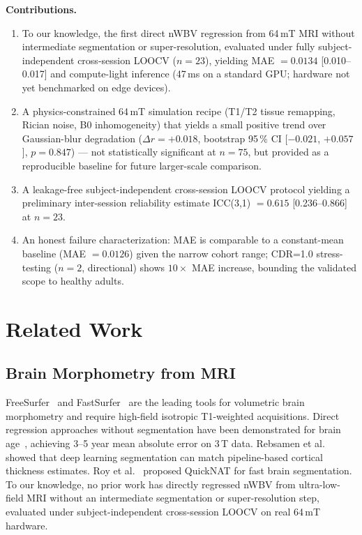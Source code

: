 \documentclass[12pt,a4paper]{article}
\begin{document}
\textbf{Contributions.}
\begin{enumerate}
  \item To our knowledge, the first direct nWBV regression from 64\,mT MRI
        without intermediate segmentation or super-resolution, evaluated under
        fully subject-independent cross-session LOOCV ($n = 23$), yielding
        MAE $= 0.0134$ [0.010--0.017] and compute-light inference (47\,ms
        on a standard GPU; hardware not yet benchmarked on edge devices).
  \item A physics-constrained 64\,mT simulation recipe (T1/T2 tissue
        remapping, Rician noise, B0 inhomogeneity) that yields a small
        positive trend over Gaussian-blur degradation ($\Delta r = +0.018$,
        bootstrap 95\,\% CI [$-0.021$, $+0.057$], $p = 0.847$) — not
        statistically significant at $n=75$, but provided as a reproducible
        baseline for future larger-scale comparison.
  \item A leakage-free subject-independent cross-session LOOCV protocol
        yielding a preliminary inter-session reliability estimate
        ICC(3,1) $= 0.615$ [0.236--0.866] at $n = 23$.
  \item An honest failure characterization: MAE is comparable to a
        constant-mean baseline (MAE $= 0.0126$) given the narrow cohort range;
        CDR=1.0 stress-testing ($n=2$, directional) shows $10\times$ MAE
        increase, bounding the validated scope to healthy adults.
\end{enumerate}

\section{Related Work}
\label{sec:related}

\subsection{Brain Morphometry from MRI}

FreeSurfer~\cite{fischl2012freesurfer} and
FastSurfer~\cite{henschel2020fastsurfer} are the leading tools for
volumetric brain morphometry and require high-field isotropic T1-weighted
acquisitions. Direct regression approaches without segmentation have been
demonstrated for brain age~\cite{peng2021brain,cole2017predicting,jonsson2019brain},
achieving 3--5 year mean absolute error on 3\,T data. Rebsamen et
al.~\cite{rebsamen2020cortical} showed that deep learning segmentation can
match pipeline-based cortical thickness estimates. Roy et
al.~\cite{roy2019quicknat} proposed QuickNAT for fast brain segmentation.
To our knowledge, no prior work has directly regressed nWBV from
ultra-low-field MRI without an intermediate segmentation or
super-resolution step, evaluated under subject-independent
cross-session LOOCV on real 64\,mT hardware.
\end{document}
